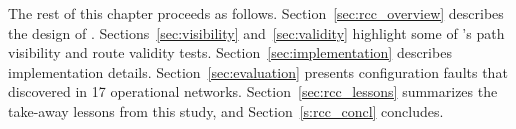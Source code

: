 The rest of this chapter proceeds as follows.
Section~\ref{sec:rcc_overview} describes the design of \rccns.
Sections~\ref{sec:visibility} and~\ref{sec:validity} highlight some of \rccns's
path visibility and route validity tests.
Section~\ref{sec:implementation} describes implementation details.
Section~\ref{sec:evaluation} presents configuration faults that \rcc
discovered in 17 operational networks.  Section~\ref{sec:rcc_lessons}
summarizes the take-away lessons from this study, and
Section~\ref{s:rcc_concl} concludes.
